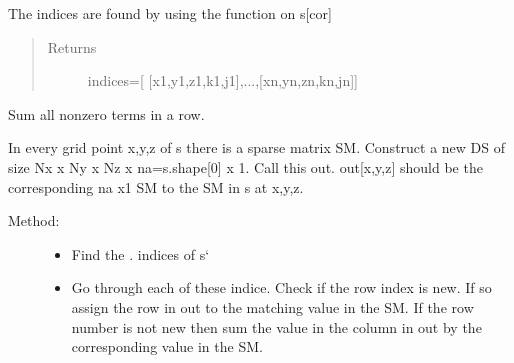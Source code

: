 \documentclass[letterpaper,10pt,english]{sphinxmanual}
\begin{document}
\begin{fulllineitems}
\begin{fulllineitems}
\begin{quote}
\begin{description}
\end{description}\end{quote}

The indices are found by using the {\hyperref[index:DictionarySparseMatrix.DS.nonzero]{}} function on s{[}cor{]}
\begin{quote}\begin{description}
\item[{Returns}] \leavevmode
indices={[} {[}x1,y1,z1,k1,j1{]},...,{[}xn,yn,zn,kn,jn{]}{]}

\end{description}\end{quote}

\end{fulllineitems}


\begin{fulllineitems}
\label{index:DictionarySparseMatrix.DS.row_sum}
Sum all nonzero terms in a row.

In every grid point x,y,z of s there is a sparse matrix SM.
Construct a new DS of size Nx x Ny x Nz x na=s.shape{[}0{]} x 1.
Call this out.
out{[}x,y,z{]} should be the corresponding na x1 SM to the SM in s at x,y,z.
\begin{description}
\item[{Method:}] \leavevmode\begin{itemize}
\item {} 
Find the {\hyperref[index:DictionarySparseMatrix.DS]{}}. {\hyperref[index:DictionarySparseMatrix.DS.nonzero]{}} indices of s{}`

\item {} 
Go through each of these indice. Check if the       row index is new. If so assign the row in out to the matching       value in the SM. If the row number is not new then sum the       value in the column in out by the corresponding value in the SM.

\end{itemize}

\end{description}


\end{fulllineitems}
\end{fulllineitems}
\end{document}
